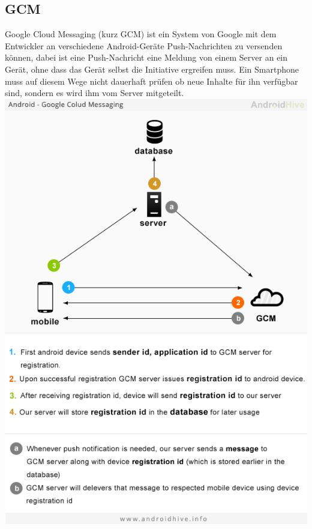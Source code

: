 \documentclass[10pt, a4paper]{scrreprt}
\begin{document}
\subsection{GCM}
Google Cloud Messaging (kurz GCM) ist ein System von Google mit dem Entwickler an verschiedene Android-Geräte Push-Nachrichten zu versenden können, dabei ist eine Push-Nachricht eine Meldung von einem Server an ein Gerät, ohne dass das Gerät selbst die Initiative ergreifen muss. Ein Smartphone muss auf diesem Wege nicht dauerhaft prüfen ob neue Inhalte für ihn verfügbar sind, sondern es wird ihm vom Server mitgeteilt. \\
\includegraphics[scale=0.6]{gcm-a-modr.png} %
\end{document}
